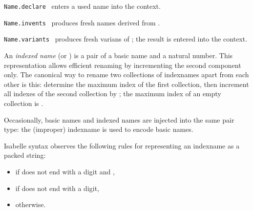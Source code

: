 \begin{isabellebody}
\begin{isamarkuptext}
\begin{description}
  \item \verb|Name.declare|~ enters a used name into the
  context.

  \item \verb|Name.invents|~ produces  fresh names derived from .

  \item \verb|Name.variants|~ produces fresh
  varians of ; the result is entered into the context.

  \end{description}%
\end{isamarkuptext}%
\isamarkuptrue%
%
\endisatagmlref
{\isafoldmlref}%
%
\isadelimmlref
%
\endisadelimmlref
%
\isamarkuptrue%
%
\begin{isamarkuptext}%
An \emph{indexed name} (or ) is a pair of a basic
  name and a natural number.  This representation allows efficient
  renaming by incrementing the second component only.  The canonical
  way to rename two collections of indexnames apart from each other is
  this: determine the maximum index  of the first
  collection, then increment all indexes of the second collection by
  ; the maximum index of an empty collection is
  .

  Occasionally, basic names and indexed names are injected into the
  same pair type: the (improper) indexname  is used
  to encode basic names.

  \medskip Isabelle syntax observes the following rules for
  representing an indexname  as a packed string:

  \begin{itemize}

  \item {} if  does not end with a digit and ,

  \item {} if  does not end with a digit,

  \item {} otherwise.

  \end{itemize}


\end{isamarkuptext}
\end{isabellebody}
